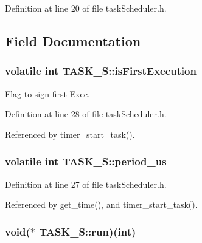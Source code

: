 Definition at line 20 of file task\-Scheduler.\-h.



\subsection{Field Documentation}
\hypertarget{structTASK__S_a4b50404ee955691f1c62845cdc9de676}{
\subsubsection[{is\-First\-Execution}]{\setlength{\rightskip}{0pt plus 5cm}volatile int T\-A\-S\-K\-\_\-\-S\-::is\-First\-Execution}}\label{structTASK__S_a4b50404ee955691f1c62845cdc9de676}


Flag to sign first Exec. 



Definition at line 28 of file task\-Scheduler.\-h.



Referenced by timer\-\_\-start\-\_\-task().

\hypertarget{structTASK__S_aabd8f80831e6cfd8e51bbd371eed907b}{
\subsubsection[{period\-\_\-us}]{\setlength{\rightskip}{0pt plus 5cm}volatile int T\-A\-S\-K\-\_\-\-S\-::period\-\_\-us}}\label{structTASK__S_aabd8f80831e6cfd8e51bbd371eed907b}


Definition at line 27 of file task\-Scheduler.\-h.



Referenced by get\-\_\-time(), and timer\-\_\-start\-\_\-task().

\hypertarget{structTASK__S_a6ce7396d04fd08be26e2e8b75a276122}{
\subsubsection[{run}]{\setlength{\rightskip}{0pt plus 5cm}void($\ast$ T\-A\-S\-K\-\_\-\-S\-::run)(int)}}\label{structTASK__S_a6ce7396d04fd08be26e2e8b75a276122}


